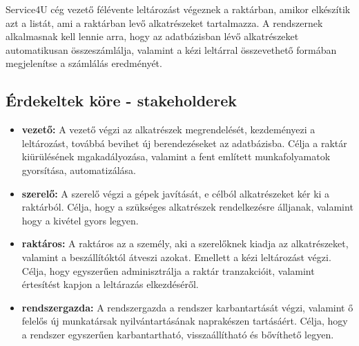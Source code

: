 \documentclass[12pt]{article}\usepackage[left=20mm,right=20mm,top=15mm,bottom=20mm]{geometry}
\begin{document}
Service4U cég vezető félévente leltározást végeznek a raktárban, amikor elkészítik azt a listát, ami a
raktárban levő alkatrészeket tartalmazza.
A rendszernek alkalmasnak kell lennie arra, hogy az adatbázisban lévő alkatrészeket automatikusan összeszámlálja, valamint a kézi leltárral összevethető formában megjelenítse a számlálás eredményét.


\subsection{Érdekeltek köre - stakeholderek}
\begin{itemize}
\item[] \textbf{vezető: } A vezető végzi az alkatrészek megrendelését, kezdeményezi a leltározást, továbbá bevihet új berendezéseket az adatbázisba. Célja a raktár kiürülésének mgakadályozása, valamint a fent említett munkafolyamatok gyorsítása, automatizálása.

\item[] \textbf{szerelő: } A szerelő végzi a gépek javítását, e célból alkatrészeket kér ki a raktárból.  Célja, hogy a szükséges alkatrészek rendelkezésre álljanak, valamint hogy a kivétel gyors legyen.

\item[] \textbf{raktáros: } A raktáros az a személy, aki a szerelőknek kiadja az alkatrészeket, valamint a beszállítóktól átveszi azokat. Emellett a kézi leltározást végzi. Célja, hogy egyszerűen adminisztrálja a raktár tranzakcióit, valamint értesítést kapjon a leltárazás elkezdéséről.

\item[] \textbf{rendszergazda: } A rendszergazda a rendszer karbantartását végzi, valamint ő felelős új munkatársak nyilvántartásának naprakészen tartásáért. Célja, hogy a rendszer egyszerűen karbantartható, visszaállítható és bővíthető legyen.
\end{itemize}
\end{document}
